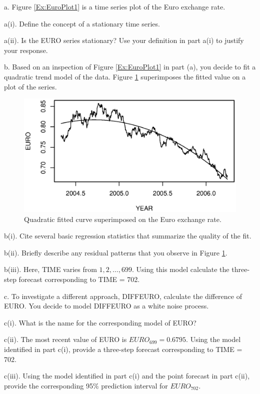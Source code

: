 \begin{exercises}
a. Figure \ref{Ex:EuroPlot1} is a time series plot of the Euro
exchange rate.

a(i). Define the concept of a stationary time series.

a(ii). Is the EURO series stationary? Use your definition in part
a(i) to justify your response.

b. Based on an inspection of Figure \ref{Ex:EuroPlot1} in part (a),
you decide to fit a quadratic trend model of the data. Figure
\ref{Ex:EuroPlot2} superimposes the fitted value on a plot of the
series.


\begin{figure}[htp]
  \begin{center}
   \includegraphics[width=1\textwidth,angle=0,scale=0.6]{Chapter7Trend/EuroPlot2.eps}
   \caption{\label{Ex:EuroPlot2} \small  Quadratic fitted curve superimposed on the Euro exchange rate.}
  \end{center}
\end{figure}

b(i). Cite several basic regression statistics that summarize the
quality of the fit.

b(ii). Briefly describe any residual patterns that you observe in
Figure \ref{Ex:EuroPlot2}.

b(iii). Here, TIME varies from $1, 2, \ldots, 699$. Using this model
calculate the three-step forecast corresponding to TIME = 702.


\bigskip

c. To investigate a different approach, DIFFEURO, calculate the
difference of EURO. You decide to model DIFFEURO as a white noise
process.

c(i).  What is the name for the corresponding model of EURO?

c(ii). The most recent value of EURO is $EURO_{699} = 0.6795$. Using
the model identified in part c(i), provide a three-step forecast
corresponding to TIME = 702.

c(iii).  Using the model identified in part c(i) and the point
forecast in part c(ii), provide the corresponding 95\% prediction
interval for $EURO_{702}$.



\end{exercises}
